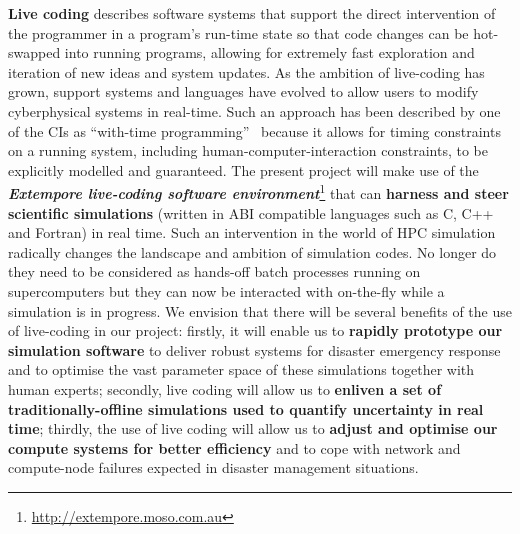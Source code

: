 \iffalse
When uncertainty is included into a model, the essential
dimensionality of the problem is increased markedly.  New and more
sophisticated techniques are then required to deal with the so called
`curse of dimensionality', where the cost of computation increases
exponentially with the dimension of the problem.  The mathematical
component of this project will be based on new developments combining
reduced order models (such as sparse grids and reduced basis methods)
with uncertainty quantification.  Sparse
grids~\parencite{BungartzGriebel2004} are known to reduce the effects
of the curse of dimensionality and recent work in our group has found
new ways to incorporate gradient information and multi-fidelity models
into sparse grid
approximations~\parencite{deBaarHarding2015,Jakeman2015,deBaarRDM2015}.
We will extend this work to construct efficient techniques for
incorporating uncertainty information into storm surge-tsunami models.
Reduced basis methods~\parencite{quarteroni2015reduced} provide an
alternative approach for constructing reduced order models and will
also be investigated.
\fi

{\bf Live coding} describes software systems that support the direct
intervention of the programmer in a program’s run-time state so that 
code changes can be 
hot-swapped into running programs, allowing for extremely fast
exploration and iteration of new ideas and system updates. As the
ambition of live-coding has grown, support systems and languages have
evolved to allow users to modify 
cyberphysical systems in real-time. Such an approach has been
described by one of the CIs as ``with-time
programming''~\parencite{sorensen2010programming} because it allows
for timing constraints on a running system, including
human-computer-interaction constraints, to be explicitly modelled and
guaranteed. The present project will make use of the {\em\bf Extempore
  live-coding software
  environment}\footnote{\url{http://extempore.moso.com.au}} that can
{\bf harness and steer scientific simulations} (written in ABI compatible
languages such as C, C++ and Fortran) in real time. Such an intervention in
the world of HPC simulation radically changes
the landscape and ambition of simulation codes. No longer do they need
to be considered as hands-off batch processes running on
supercomputers but they can now be interacted with on-the-fly while a
simulation is in progress. We envision that there will be several
benefits of the use of live-coding in our project: firstly, it
will enable us to {\bf rapidly prototype our simulation software}  to
deliver robust systems for
disaster emergency response and to optimise the vast parameter space of these simulations together with 
human experts; secondly, live coding will allow us to
{\bf enliven a set of traditionally-offline simulations used to
quantify uncertainty in real time}; thirdly, the use of live coding
will allow us to {\bf adjust and optimise our compute systems for better efficiency} and to cope 
with network and compute-node failures expected in disaster management situations.

